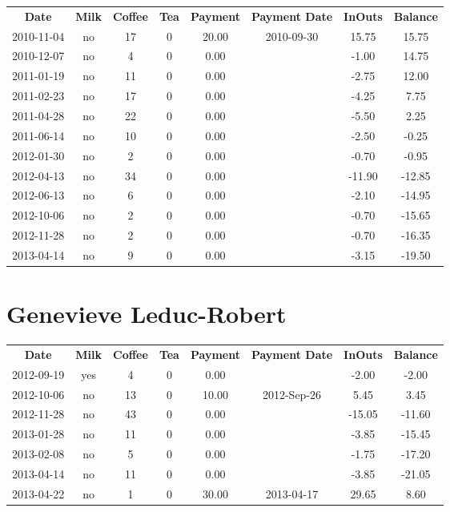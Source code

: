 \begin{center}
\begin{tabular}{cccccccc}
\textbf{Date} & \textbf{Milk} & \textbf{Coffee} & \textbf{Tea} & \textbf{Payment} & \textbf{Payment Date} & \textbf{InOuts} & \textbf{Balance} \\
2010-11-04 & no & 17 & 0 & 20.00 & 2010-09-30 &  15.75 &  15.75\\ 
2010-12-07 & no &  4 & 0 &  0.00 &  &  -1.00 &  14.75\\ 
2011-01-19 & no & 11 & 0 &  0.00 &  &  -2.75 &  12.00\\ 
2011-02-23 & no & 17 & 0 &  0.00 &  &  -4.25 &   7.75\\ 
2011-04-28 & no & 22 & 0 &  0.00 &  &  -5.50 &   2.25\\ 
2011-06-14 & no & 10 & 0 &  0.00 &  &  -2.50 &  -0.25\\ 
2012-01-30 & no &  2 & 0 &  0.00 &  &  -0.70 &  -0.95\\ 
2012-04-13 & no & 34 & 0 &  0.00 &  & -11.90 & -12.85\\ 
2012-06-13 & no &  6 & 0 &  0.00 &  &  -2.10 & -14.95\\ 
2012-10-06 & no &  2 & 0 &  0.00 &  &  -0.70 & -15.65\\ 
2012-11-28 & no &  2 & 0 &  0.00 &  &  -0.70 & -16.35\\ 
2013-04-14 & no &  9 & 0 &  0.00 &  &  -3.15 & -19.50
\end{tabular}
\end{center}

\section{Genevieve Leduc-Robert}

\begin{center}
\begin{tabular}{cccccccc}
\textbf{Date} & \textbf{Milk} & \textbf{Coffee} & \textbf{Tea} & \textbf{Payment} & \textbf{Payment Date} & \textbf{InOuts} & \textbf{Balance} \\
2012-09-19 & yes &  4 & 0 &  0.00 &  &  -2.00 &  -2.00\\ 
2012-10-06 & no & 13 & 0 & 10.00 & 2012-Sep-26 &   5.45 &   3.45\\ 
2012-11-28 & no & 43 & 0 &  0.00 &  & -15.05 & -11.60\\ 
2013-01-28 & no & 11 & 0 &  0.00 &  &  -3.85 & -15.45\\ 
2013-02-08 & no &  5 & 0 &  0.00 &  &  -1.75 & -17.20\\ 
2013-04-14 & no & 11 & 0 &  0.00 &  &  -3.85 & -21.05\\ 
2013-04-22 & no &  1 & 0 & 30.00 & 2013-04-17 &  29.65 &   8.60
\end{tabular}
\end{center}

